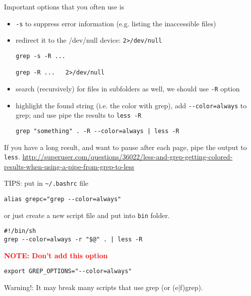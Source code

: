 Important options that you often use is 
\begin{itemize}
  \item  \verb!-s! to suppress error
information (e.g. listing the inaccessible files) 

  \item redirect it to the /dev/null device: \verb!2>/dev/null!  

\begin{verbatim}
grep -s -R ...

grep -R ...   2>/dev/null
\end{verbatim}
  
  \item search (recursively) for files in subfolders as well, we should use
  \verb!-R! option

  
  \item highlight the found string (i.e. the color with grep), add
  \verb!--color=always! to grep; and use 
  pipe the results to \verb!less -R! 
  
\begin{verbatim}
grep "something" . -R --color=always | less -R
\end{verbatim}
\end{itemize}


If you have a long result, and want to pause after each page, pipe the output
to  \verb!less!.
\url{http://superuser.com/questions/36022/less-and-grep-getting-colored-results-when-using-a-pipe-from-grep-to-less}

\begin{mdframed}

TIPS: put in \verb!~/.bashrc! file
\begin{verbatim}
alias grepc="grep --color=always"
\end{verbatim}
or just create a new script file and put into \verb!bin! folder.
\begin{verbatim}
#!/bin/sh
grep --color=always -r "$@" . | less -R
\end{verbatim}

\textcolor{red}{\bf NOTE: Don't add this option} 
\begin{verbatim}
export GREP_OPTIONS="--color=always"
\end{verbatim}
Warning!: It may break many scripts that use grep (or (e|f)grep).
\end{mdframed}



